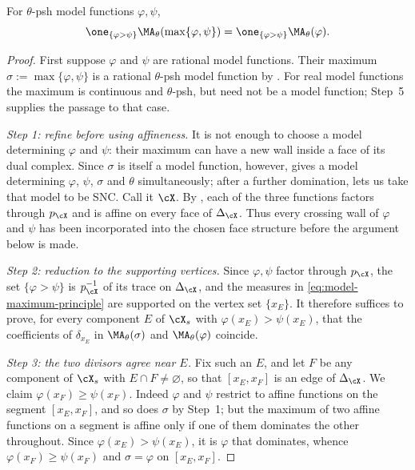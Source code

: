 \begin{proposition}\label{prop:model-maximum-principle}
For $\theta$-psh model functions $\varphi,\psi$,
\begin{equation}
\label{eq:model-maximum-principle}
 \one_{\{\varphi>\psi\}}
 \MA_\theta(\max\{\varphi,\psi\})
 =\one_{\{\varphi>\psi\}}\MA_\theta(\varphi).
\end{equation}
\end{proposition}

\begin{proof}
First suppose $\varphi$ and $\psi$ are rational model functions.
Their maximum $\sigma:=\max\{\varphi,\psi\}$ is a rational
$\theta$-psh model function by .
For real model functions the maximum is continuous and $\theta$-psh,
but need not be a model function; Step~5 supplies the passage to that case.

\emph{Step 1: refine before using affineness.}  It is not enough to choose a
model determining $\varphi$ and $\psi$: their maximum can have a new wall
inside a face of its dual complex.  Since $\sigma$ is itself a model
function, however,  gives a model determining
$\varphi$, $\psi$, $\sigma$ and $\theta$ simultaneously; after a further
domination,  lets us take that model to be SNC.  Call
it $\cX$.  By , each of the three functions
factors through $p_{\cX}$ and is affine on every face of
$\Delta_{\cX}$.  Thus every crossing wall of $\varphi$ and $\psi$ has been
incorporated into the chosen face structure before the argument below is
made.

\emph{Step 2: reduction to the supporting vertices.}  Since
$\varphi,\psi$ factor through $p_{\cX}$, the set $\{\varphi>\psi\}$ is
$p_{\cX}^{-1}$ of its trace on $\Delta_{\cX}$, and the measures in
\eqref{eq:model-maximum-principle} are supported on the vertex set
$\{x_E\}$.  It therefore suffices to prove, for every component $E$ of
$\cX_s$ with $\varphi(x_E)>\psi(x_E)$, that the coefficients of
$\delta_{x_E}$ in $\MA_\theta(\sigma)$ and $\MA_\theta(\varphi)$
coincide.

\emph{Step 3: the two divisors agree near $E$.}  Fix such an $E$, and
let $F$ be any component of $\cX_s$ with $E\cap F\neq\varnothing$, so
that $[x_E,x_F]$ is an edge of $\Delta_{\cX}$.  We claim
$\varphi(x_F)\geq\psi(x_F)$.  Indeed $\varphi$ and $\psi$ restrict to
affine functions on the segment $[x_E,x_F]$, and so does $\sigma$ by
Step~1; but the maximum of two affine functions on a segment is affine only
if one of them dominates the other throughout.  Since
$\varphi(x_E)>\psi(x_E)$, it is $\varphi$ that dominates, whence
$\varphi(x_F)\geq\psi(x_F)$ and $\sigma=\varphi$ on $[x_E,x_F]$.


\end{proof}
